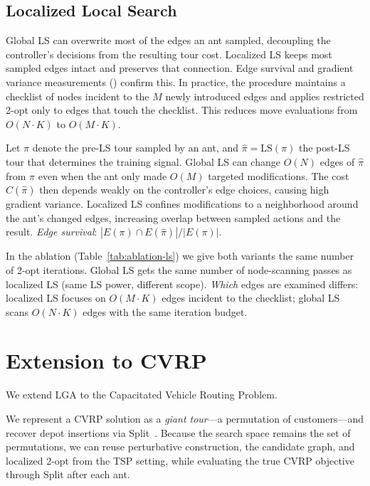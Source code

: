 \documentclass[sigconf,anonymous,review]{acmart}
\theoremstyle{definition}
\theoremstyle{plain}
\newcommand{\CVRP}{\textsc{CVRP}}
\newcommand{\LGA}{\textsc{LGA}}
\begin{document}
\subsection{Localized Local Search}
\label{sec:localized-ls}

Global LS can overwrite most of the edges an ant sampled, decoupling the controller's decisions from the resulting tour cost. Localized LS keeps most sampled edges intact and preserves that connection.
Edge survival and gradient variance measurements () confirm this.
In practice, the procedure maintains a checklist of nodes incident to the $M$ newly introduced edges and applies restricted 2-opt only to edges that touch the checklist.
This reduces move evaluations from $O(N \cdot K)$ to $O(M \cdot K)$.

Let $\pi$ denote the pre-LS tour sampled by an ant, and $\hat{\pi}=\mathrm{LS}(\pi)$ the post-LS tour that determines the training signal.
Global LS can change $O(N)$ edges of $\hat{\pi}$ from $\pi$ even when the ant only made $O(M)$ targeted modifications.
The cost $C(\hat{\pi})$ then depends weakly on the controller's edge choices, causing high gradient variance.
Localized LS confines modifications to a neighborhood around the ant's changed edges, increasing overlap between sampled actions and the result.
\emph{Edge survival}: $|E(\pi)\cap E(\hat{\pi})|/|E(\pi)|$.

In the ablation (Table~\ref{tab:ablation-ls}) we give both variants the same number of 2-opt iterations.
Global LS gets the same number of node-scanning passes as localized LS (same LS power, different scope).
\emph{Which} edges are examined differs: localized LS focuses on $O(M \cdot K)$ edges incident to the checklist; global LS scans $O(N \cdot K)$ edges with the same iteration budget.

\section{Extension to \CVRP{}}
\label{sec:cvrp}
We extend \LGA{} to the Capacitated Vehicle Routing Problem.

We represent a CVRP solution as a \emph{giant tour}---a permutation of customers---and recover depot insertions via Split~\cite{prins2004}.
Because the search space remains the set of permutations, we can reuse perturbative construction, the candidate graph, and localized 2-opt from the TSP setting, while evaluating the true CVRP objective through Split after each ant.
\end{document}
